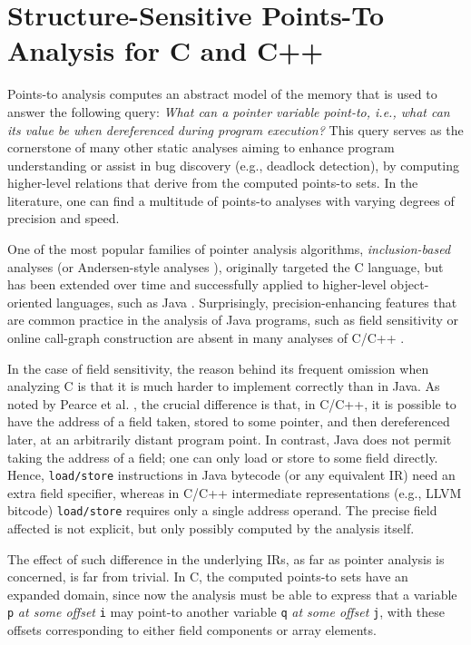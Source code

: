 \documentclass{llncs}
\newcommand{\code}[1]{\texttt{#1}}
\begin{document}
\section{Structure-Sensitive Points-To Analysis for C and C++}

Points-to analysis computes an abstract model of the memory that is
used to answer the following query: \emph{What can a pointer variable
  point-to, i.e., what can its value be when dereferenced during
  program execution?}  This query serves as the cornerstone of
many other static analyses aiming to enhance program understanding or
assist in bug discovery (e.g., deadlock detection), by computing
higher-level relations that derive from the computed points-to
sets. In the literature, one can find a multitude of points-to
analyses with varying degrees of precision and speed.

One of the most popular families of pointer analysis algorithms,
\emph{inclusion-based} analyses (or Andersen-style analyses
\cite{andersen:thesis}), originally targeted the C language, but has
been extended over time and successfully applied to higher-level
object-oriented languages, such as Java
\cite{pldi/BerndlLQHU03,oopsla/BravenboerS09,issta/MilanovaRR02,oopsla/RountevMR01,oopsla/WhaleyR99}.
Surprisingly, precision-enhancing features that are common practice in
the analysis of Java programs, such as field sensitivity or online
call-graph construction are absent in many analyses of C/C++
\cite{antgrasshopper,toplas/HindBCC99,popl/ZhengR08,pldi/HeintzeT01a,pldi/Das00,sas/HardekopfL07}.

In the case of field sensitivity, the reason behind its frequent
omission when analyzing C is that it is much harder to implement
correctly than in Java. As noted by Pearce et
al. \cite{toplas/PearceKH07}, the crucial difference is that, in C/C++,
it is possible to have the address of a field taken, stored to some
pointer, and then dereferenced later, at an arbitrarily distant
program point. In contrast, Java does not permit taking the address of
a field; one can only load or store to some field directly. Hence,
\code{load/store} instructions in Java bytecode (or any equivalent IR)
need an extra field specifier, whereas in C/C++ intermediate
representations (e.g., LLVM bitcode) \code{load/store} requires only a
single address operand. The precise field affected is not explicit, but
only possibly computed by the analysis itself.

The effect of such difference in the underlying IRs, as far as pointer
analysis is concerned, is far from trivial. In C, the computed
points-to sets have an expanded domain, since now the analysis must
be able to express that a variable \code{p} \emph{at some offset}
\code{i} may point-to another variable \code{q} \emph{at some offset}
\code{j}, with these offsets corresponding to either field components or
array elements.
\end{document}
